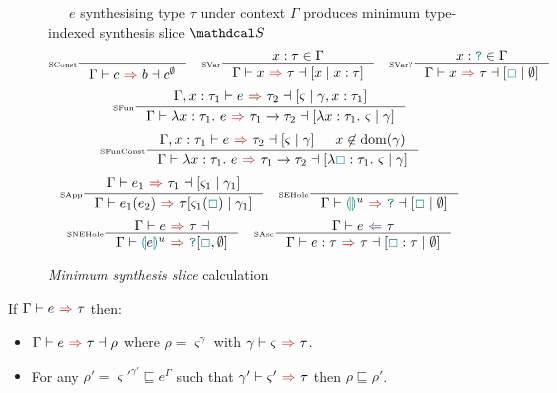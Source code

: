 \begin{figure}[H]
\ \ \ $e$ synthesising type $\tau$ under context $\Gamma$ produces minimum type-indexed synthesis slice $\S$
\[\inference[\tiny SConst]{}{\synthesisslice{c}{b}{c^\emptyset}} \quad
\inference[\tiny SVar]{x : \tau \in \Gamma}{\synthesisslice{x}{\tau}{[x\mid x:\tau]}} \quad
\inference[\tiny SVar?]{x : \dyn \in \Gamma}{\synthesisslice{x}{\tau}{[\gap\mid \emptyset]}}\]
\[\inference[\tiny SFun]{\synthesisslice[\Gamma,x:\tau_1]{e}{\tau_2}{[\varsigma \mid \gamma, x : \tau_1]} }{\synthesisslice{\lambda x:\tau_1.\ e}{\tau_1 \to \tau_2}{[\lambda x : \tau_1.\ \varsigma \mid \gamma]}}\]
\[\inference[\tiny SFunConst]{\synthesisslice[\Gamma,x:\tau_1]{e}{\tau_2}{[\varsigma \mid \gamma]} & x \not \in \mathrm{dom}(\gamma)}{\synthesisslice{\lambda x:\tau_1.\ e}{\tau_1 \to \tau_2}{[\lambda \gap : \tau_1.\ \varsigma \mid \gamma]}}\]
\[\inference[\tiny SApp]{\synthesisslice{e_1}{\tau_1}{[\varsigma_1 \mid \gamma_1]}}{\synthesis{e_1(e_2)}{\tau}{[\varsigma_1(\gap) \mid \gamma_1]}} \quad 
\inference[\tiny SEHole]{}{\synthesisslice{\hole^u}{\dyn}{[\gap \mid \emptyset]}}\]
\[\inference[\tiny SNEHole]{\synthesisslice{e}{\tau}}{\synthesis{\hole[e]^u}{\dyn}{[\gap, \emptyset]}}\quad 
\inference[\tiny SAsc]{\analysis{e}{\tau}}{\synthesisslice{e : \tau}{\tau}{[\gap : \tau \mid \emptyset]}}\]

\caption{\textit{Minimum synthesis slice} calculation}
\label{fig:SynthesisSlices}
\end{figure} 


\begin{conjecture}[Correctness]
\label{conj:SynthesisSliceCorrectness}
If $\synthesis{e}{\tau}$ then:
\begin{itemize}
\item $\synthesisslice{e}{\tau}{\rho}$ where $\rho = \varsigma^\gamma$ with $\synthesis[\gamma]{\varsigma}{\tau}$.
\item For any $\rho' = \varsigma'^{\gamma'} \sqsubseteq e^\Gamma$ such that $\synthesis[\gamma']{\varsigma'}{\tau}$ then $\rho \sqsubseteq \rho'$.
\end{itemize}
\end{conjecture}

